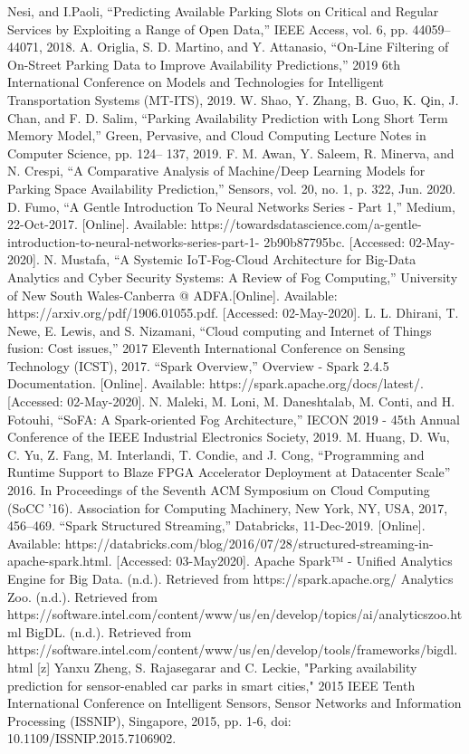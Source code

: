 \begin{thebibliography}{}
Nesi, and I.Paoli, “Predicting Available Parking Slots on Critical and Regular Services by Exploiting a Range of
Open Data,” IEEE Access, vol. 6, pp. 44059–44071, 2018.
 A. Origlia, S. D. Martino, and Y. Attanasio, “On-Line Filtering of On-Street Parking Data to Improve Availability
Predictions,” 2019 6th International Conference on Models and Technologies for Intelligent Transportation
Systems (MT-ITS), 2019.
 W. Shao, Y. Zhang, B. Guo, K. Qin, J. Chan, and F. D. Salim, “Parking Availability Prediction with Long Short
Term Memory Model,” Green, Pervasive, and Cloud Computing Lecture Notes in Computer Science, pp. 124–
137, 2019.
 F. M. Awan, Y. Saleem, R. Minerva, and N. Crespi, “A Comparative Analysis of Machine/Deep Learning
Models for Parking Space Availability Prediction,” Sensors, vol. 20, no. 1, p. 322, Jun. 2020.
 D. Fumo, “A Gentle Introduction To Neural Networks Series - Part 1,” Medium, 22-Oct-2017. [Online].
Available: https://towardsdatascience.com/a-gentle-introduction-to-neural-networks-series-part-1-
2b90b87795bc. [Accessed: 02-May-2020].
 N. Mustafa, “A Systemic IoT-Fog-Cloud Architecture for Big-Data Analytics and Cyber Security Systems: A
Review of Fog Computing,” University of New South Wales-Canberra @ ADFA.[Online]. Available:
https://arxiv.org/pdf/1906.01055.pdf. [Accessed: 02-May-2020].
 L. L. Dhirani, T. Newe, E. Lewis, and S. Nizamani, “Cloud computing and Internet of Things fusion: Cost
issues,” 2017 Eleventh International Conference on Sensing Technology (ICST), 2017.
 “Spark Overview,” Overview - Spark 2.4.5 Documentation. [Online]. Available:
https://spark.apache.org/docs/latest/. [Accessed: 02-May-2020].
 N. Maleki, M. Loni, M. Daneshtalab, M. Conti, and H. Fotouhi, “SoFA: A Spark-oriented Fog
Architecture,” IECON 2019 - 45th Annual Conference of the IEEE Industrial Electronics Society, 2019.
 M. Huang, D. Wu, C. Yu, Z. Fang, M. Interlandi, T. Condie, and J. Cong, “Programming and Runtime Support to
Blaze FPGA Accelerator Deployment at Datacenter Scale” 2016. In Proceedings of the Seventh ACM
Symposium on Cloud Computing (SoCC ’16). Association for Computing Machinery, New York, NY, USA, 2017,
456–469.
 “Spark Structured Streaming,” Databricks, 11-Dec-2019. [Online]. Available:
https://databricks.com/blog/2016/07/28/structured-streaming-in-apache-spark.html. [Accessed: 03-May2020].
 Apache Spark™ - Unified Analytics Engine for Big Data. (n.d.). Retrieved from https://spark.apache.org/
 Analytics Zoo. (n.d.). Retrieved from https://software.intel.com/content/www/us/en/develop/topics/ai/analyticszoo.html
 BigDL. (n.d.). Retrieved from https://software.intel.com/content/www/us/en/develop/tools/frameworks/bigdl.html
 [z] Yanxu Zheng, S. Rajasegarar and C. Leckie, "Parking availability prediction for sensor-enabled car parks in smart cities," 2015 IEEE Tenth International Conference on Intelligent Sensors, Sensor Networks and Information Processing (ISSNIP), Singapore, 2015, pp. 1-6, doi: 10.1109/ISSNIP.2015.7106902. 
\end{thebibliography}
